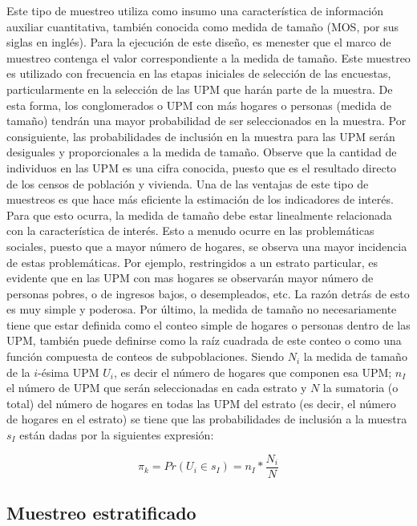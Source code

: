 \documentclass[12pt,spanish,]{book}
\begin{document}
Este tipo de muestreo utiliza como insumo una característica de información auxiliar cuantitativa, también conocida como medida de tamaño (MOS, por sus siglas en inglés). Para la ejecución de este diseño, es menester que el marco de muestreo contenga el valor correspondiente a la medida de tamaño. Este muestreo es utilizado con frecuencia en las etapas iniciales de selección de las encuestas, particularmente en la selección de las UPM que harán parte de la muestra. De esta forma, los conglomerados o UPM con más hogares o personas (medida de tamaño) tendrán una mayor probabilidad de ser seleccionados en la muestra. Por consiguiente, las probabilidades de inclusión en la muestra para las UPM serán desiguales y proporcionales a la medida de tamaño. Observe que la cantidad de individuos en las UPM es una cifra conocida, puesto que es el resultado directo de los censos de población y vivienda.
Una de las ventajas de este tipo de muestreos es que hace más eficiente la estimación de los indicadores de interés. Para que esto ocurra, la medida de tamaño debe estar linealmente relacionada con la característica de interés. Esto a menudo ocurre en las problemáticas sociales, puesto que a mayor número de hogares, se observa una mayor incidencia de estas problemáticas. Por ejemplo, restringidos a un estrato particular, es evidente que en las UPM con mas hogares se observarán mayor número de personas pobres, o de ingresos bajos, o desempleados, etc. La razón detrás de esto es muy simple y poderosa. Por último, la medida de tamaño no necesariamente tiene que estar definida como el conteo simple de hogares o personas dentro de las UPM, también puede definirse como la raíz cuadrada de este conteo o como una función compuesta de conteos de subpoblaciones. Siendo \(N_i\) la medida de tamaño de la \(i\)-ésima UPM \(U_i\), es decir el número de hogares que componen esa UPM; \(n_I\) el número de UPM que serán seleccionadas en cada estrato y \(N\) la sumatoria (o total) del número de hogares en todas las UPM del estrato (es decir, el número de hogares en el estrato) se tiene que las probabilidades de inclusión a la muestra \(s_I\) están dadas por la siguientes expresión:

\[\pi_k = Pr(U_i \in s_I) = n_I * \frac{N_i}{N}\]

\hypertarget{muestreo-estratificado}{%
\subsection*{Muestreo estratificado}\label{muestreo-estratificado}}
\end{document}
